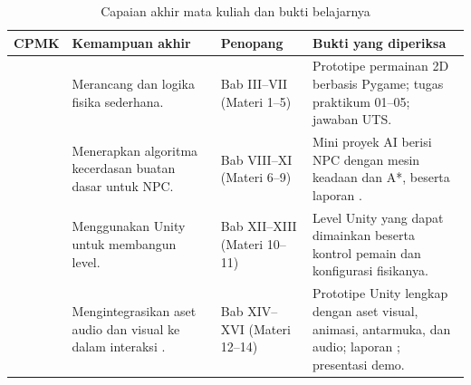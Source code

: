 \begin{table}[htbp]
\centering
\caption{Capaian akhir mata kuliah dan bukti belajarnya}
\label{tab:capaian-bukti}
{\setlength{\tabcolsep}{4pt}\footnotesize%
\begin{tabularx}{\textwidth}{@{}C{1.7cm} L{4.6cm} L{3.6cm} Y@{}}
\toprule
\headrow \textbf{CPMK} & \textbf{Kemampuan akhir} & \textbf{Penopang} & \textbf{Bukti yang diperiksa} \\
\midrule
{} &
Merancang  dan logika fisika sederhana. &
Bab III--VII (Materi 1--5) &
Prototipe permainan 2D berbasis Pygame; tugas praktikum 01--05; jawaban UTS. \\
\addlinespace
{} &
Menerapkan algoritma kecerdasan buatan dasar untuk NPC. &
Bab VIII--XI (Materi 6--9) &
Mini proyek AI berisi NPC dengan mesin keadaan dan A*, beserta laporan
. \\
\addlinespace
{} &
Menggunakan  Unity untuk membangun level. &
Bab XII--XIII (Materi 10--11) &
Level Unity yang dapat dimainkan beserta kontrol pemain dan konfigurasi
fisikanya. \\
\addlinespace
{} &
Mengintegrasikan aset audio dan visual ke dalam interaksi . &
Bab XIV--XVI (Materi 12--14) &
Prototipe Unity lengkap dengan aset visual, animasi, antarmuka, dan audio;
laporan ; presentasi demo. \\
\bottomrule
\end{tabularx}}
\end{table}
